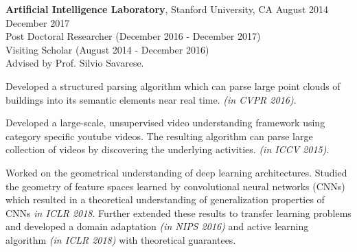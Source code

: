  \textbf{Artificial Intelligence Laboratory}, Stanford University, CA \hfill August 2014 \textendash ~ December 2017 \vspace{0mm}\\\vspace{0mm}
 \hspace{-1mm}Post Doctoral Researcher (December 2016 - December 2017)  \hfill  \\
 \hspace{-1mm}Visiting Scholar (August 2014 - December 2016)  \hfill \vspace{1.5mm} \\
 Advised by Prof. Silvio Savarese.

Developed a structured parsing algorithm which can parse large point clouds of buildings into its semantic elements near real time. \emph{(in CVPR 2016)}.

Developed a large-scale, unsupervised video understanding framework using category specific youtube videos. The resulting algorithm can parse large collection of videos by discovering the underlying activities. \emph{(in ICCV 2015)}.

 Worked on the geometrical understanding of deep learning architectures. Studied the geometry of feature spaces learned by convolutional neural networks (CNNs) which resulted in a theoretical understanding of generalization properties of CNNs \emph{in ICLR 2018}. Further extended these results to transfer learning problems and developed a domain adaptation \emph{(in NIPS 2016)} and active learning algorithm \emph{(in ICLR 2018)} with theoretical guarantees. 